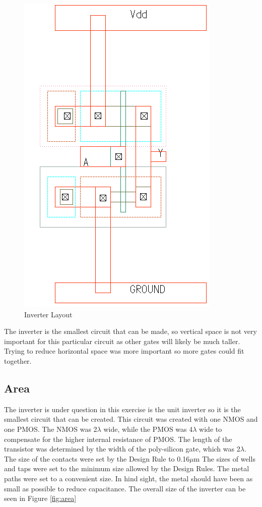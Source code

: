 \documentclass[11pt]{article}
\begin{document}
		\begin{figure}[H]
			\centering
			\includegraphics[width=0.7\linewidth]{Pictures/Layout}
			\caption{Inverter Layout}
			\label{fig:layout}
		\end{figure}
	
		The inverter is the smallest circuit that can be made, so vertical space is not very important for this particular circuit as other gates will likely be much taller. Trying to reduce horizontal space was more important so more gates could fit together.

	\subsection {Area}
	
		The inverter is under question in this exercise is the unit inverter so it is the smallest circuit that can be created. This circuit was created with one NMOS and one PMOS. The NMOS was 2$\lambda$ wide, while the PMOS was 4$\lambda$ wide to compensate for the higher internal resistance of PMOS. The length of the transistor was determined by the width of the poly-silicon gate, which was 2$\lambda$. The size of the contacts were set by the Design Rule to 0.16$\mu$m The sizes of wells and taps were set to the minimum size allowed by the Design Rules. The metal paths were set to a convenient size. In hind sight, the metal should have been as small as possible to reduce capacitance. The overall size of the inverter can be seen in Figure \ref{fig:area}
		
\end{document}
